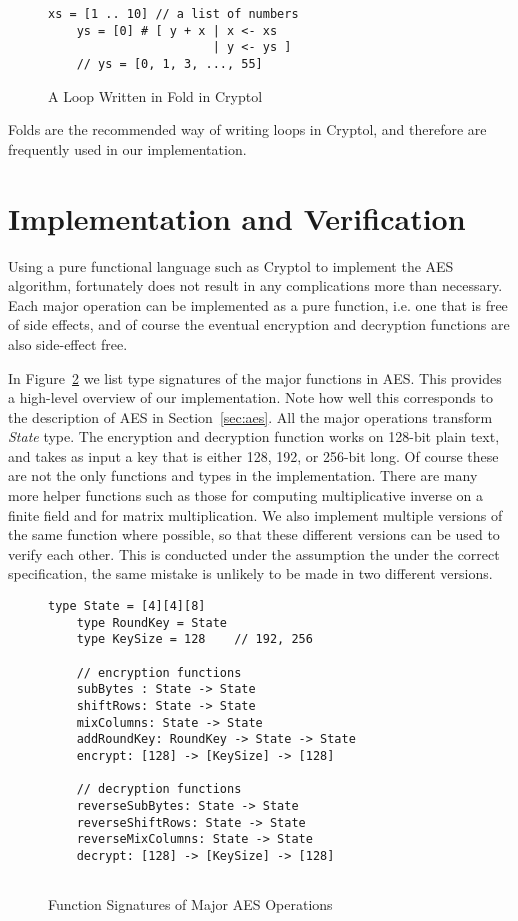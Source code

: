 \documentclass[a4paper, notitlepage]{report}
\begin{document}
\begin{figure}
  \begin{lstlisting}[frame=single]
    xs = [1 .. 10] // a list of numbers
    ys = [0] # [ y + x | x <- xs 
                       | y <- ys ]
    // ys = [0, 1, 3, ..., 55]
  \end{lstlisting}
  \caption{A Loop Written in Fold in Cryptol}
  \label{fig:fold}
\end{figure}

Folds are the recommended way of writing loops in Cryptol, and therefore are
frequently used in our implementation.


\section{Implementation and Verification}
\label{sec:correct}

Using a pure functional language such as Cryptol to implement the AES algorithm,
fortunately does not result in any complications more than necessary. Each major
operation can be implemented as a pure function, i.e. one that is free of side
effects, and of course the eventual encryption and decryption functions are also
side-effect free.

In Figure~\ref{fig:functions} we list type signatures of the major functions
in AES. This provides a high-level overview of our implementation. Note how
well this corresponds to the description of AES in Section~\ref{sec:aes}.
All the major operations transform \emph{State} type. The encryption and decryption
function works on 128-bit plain text, and takes as input a key that is either
128, 192, or 256-bit long. Of course these are not the only functions and types in
the implementation. There are many more helper functions such as those for computing
multiplicative inverse on a finite field and for matrix multiplication.
We also implement multiple versions of the same function where possible, so that
these different versions can be used to verify each other. This is conducted
under the assumption the under the correct specification, the same mistake is
unlikely to be made in two different versions.

\begin{figure}
  \begin{lstlisting}[frame=single]
    type State = [4][4][8]
    type RoundKey = State
    type KeySize = 128    // 192, 256

    // encryption functions
    subBytes : State -> State
    shiftRows: State -> State
    mixColumns: State -> State
    addRoundKey: RoundKey -> State -> State
    encrypt: [128] -> [KeySize] -> [128]

    // decryption functions
    reverseSubBytes: State -> State
    reverseShiftRows: State -> State
    reverseMixColumns: State -> State
    decrypt: [128] -> [KeySize] -> [128]
    
  \end{lstlisting}
  \caption{Function Signatures of Major AES Operations}
  \label{fig:functions}
\end{figure}
\end{document}
